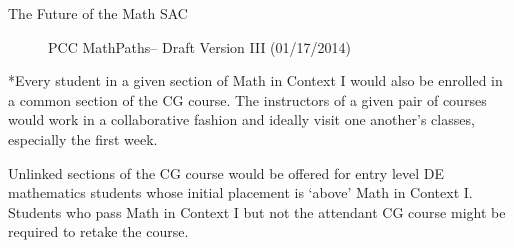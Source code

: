 \documentclass{beamer}
\begin{document}
\begin{frame}{The Future of the Math SAC}

\begin{figure}[!htb]
  \centering
  
  \caption{PCC MathPaths-- Draft Version III (01/17/2014)}
  \label{app:figure:pathways}
\end{figure}

*Every student in a given section of Math in Context I 
would also be enrolled in a common section of the CG 
course.  The instructors of a given pair of courses 
would work in a collaborative fashion and ideally visit 
one another's classes, especially the first week. 

Unlinked sections of the CG course would be offered 
for entry level DE mathematics students whose initial 
placement is `above' Math in Context I.  Students who 
pass Math in Context I but not the attendant CG course 
might be required to retake the course.

\end{frame}
\end{document}
